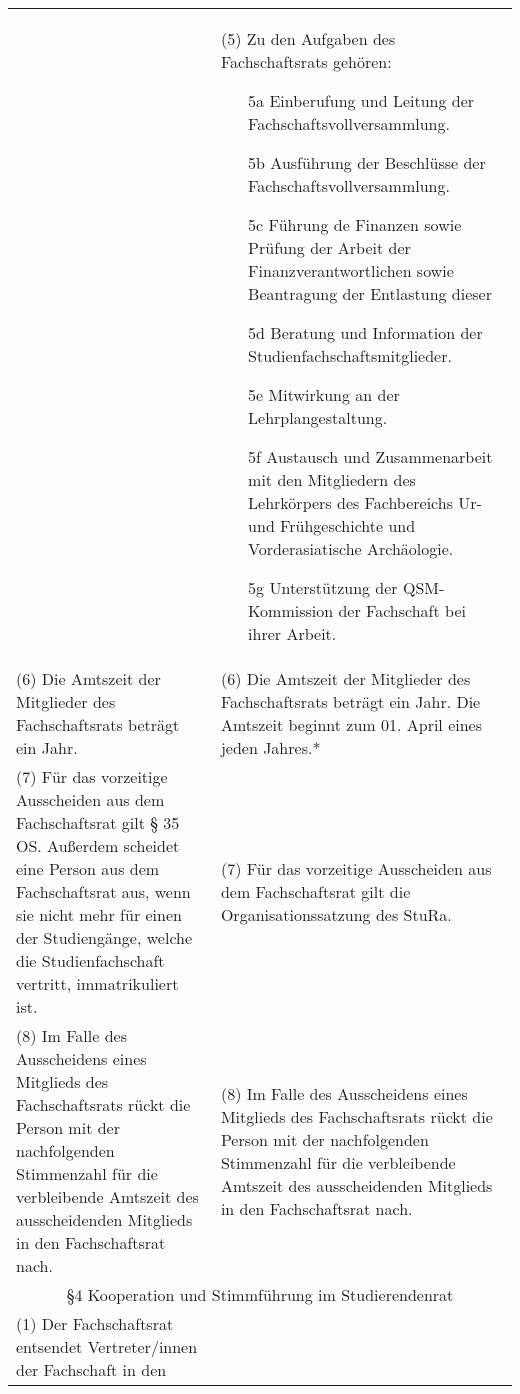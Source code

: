 {\begin{longtable}{|p{7.5cm}|p{7.5cm}|}
\begin{itemize}
        \end{itemize}&
        (5)  Zu den Aufgaben des Fachschaftsrats gehören:
        \begin{itemize}
        \item[5a]Einberufung und Leitung der Fachschaftsvollversammlung.
        \item[5b]Ausführung der Beschlüsse der Fachschaftsvollversammlung.
        \item[5c]Führung de Finanzen sowie Prüfung der Arbeit der Finanzverantwortlichen sowie
        Beantragung der Entlastung dieser
        \item[5d]Beratung und Information der Studienfachschaftsmitglieder.
        \item[5e]Mitwirkung an der Lehrplangestaltung.
        \item[5f]Austausch und Zusammenarbeit mit den Mitgliedern des Lehrkörpers des Fachbereichs Ur- und Frühgeschichte und Vorderasiatische Archäologie.    
        \item[5g]Unterstützung der QSM-Kommission der Fachschaft bei ihrer Arbeit. 
        \end{itemize}\\
        (6)  Die Amtszeit der Mitglieder des Fachschaftsrats beträgt ein Jahr.&(6)  Die Amtszeit der Mitglieder des Fachschaftsrats beträgt ein Jahr. Die Amtszeit
        beginnt zum 01. April eines jeden Jahres.*\\
        (7)  Für das vorzeitige Ausscheiden aus dem Fachschaftsrat gilt § 35 OS. Außerdem
        scheidet eine Person aus dem Fachschaftsrat aus, wenn sie nicht mehr für einen der
        Studiengänge, welche die Studienfachschaft vertritt, immatrikuliert ist.&(7)  Für das vorzeitige Ausscheiden aus dem Fachschaftsrat gilt die
        Organisationssatzung des StuRa.\\
        (8) Im Falle des Ausscheidens eines Mitglieds des Fachschaftsrats rückt die Person
        mit der nachfolgenden Stimmenzahl für die verbleibende Amtszeit des ausscheidenden
        Mitglieds in den Fachschaftsrat nach.&(8) Im Falle des Ausscheidens eines Mitglieds des Fachschaftsrats rückt die Person
        mit der nachfolgenden Stimmenzahl für die verbleibende Amtszeit des ausscheidenden
        Mitglieds in den Fachschaftsrat nach.\\\hline
        \multicolumn{2}{|c|}{§4 Kooperation und Stimmführung im Studierendenrat}\\\hline
        (1)  Der Fachschaftsrat entsendet Vertreter/innen der Fachschaft in den

\end{longtable}}
